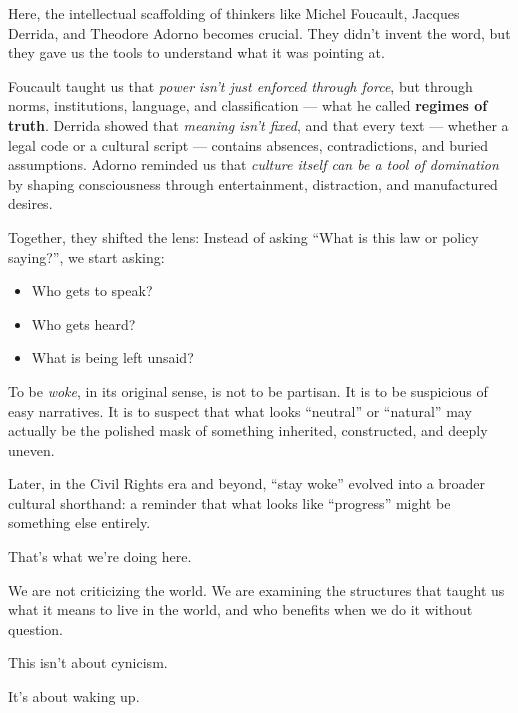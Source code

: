 \medskip

Here, the intellectual scaffolding of thinkers like Michel Foucault, Jacques Derrida, and 
Theodore Adorno becomes crucial.  
They didn’t invent the word, but they gave us the tools to understand what it was pointing at.

Foucault taught us that \textit{power isn’t just enforced through force}, but through norms, institutions, language, 
and classification — what he called \textbf{regimes of truth}.  
Derrida showed that \textit{meaning isn’t fixed}, and that every text — whether a legal code or a cultural script — 
contains absences, contradictions, and buried assumptions.
Adorno reminded us that \textit{culture itself can be a tool of domination} by shaping consciousness 
through entertainment, distraction, and manufactured desires.

Together, they shifted the lens:  
Instead of asking ``What is this law or policy saying?'', we start asking:  
\begin{itemize}
  \item Who gets to speak? 
  \item Who gets heard? 
  \item What is being left unsaid?
\end{itemize}

To be \textit{woke}, in its original sense, is not to be partisan.  
It is to be suspicious of easy narratives.  
It is to suspect that what looks ``neutral'' or ``natural'' may actually be the polished mask of something inherited, 
constructed, and deeply uneven.

Later, in the Civil Rights era and beyond, ``stay woke'' evolved into a broader cultural shorthand:  
a reminder that what looks like ``progress'' might be something else entirely.

That’s what we’re doing here.

We are not criticizing the world. We are examining the structures that taught us what it means to live in the world, 
and who benefits when we do it without question.

This isn’t about cynicism.

It’s about waking up.


